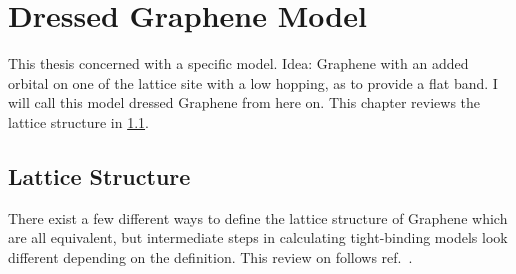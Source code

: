 \documentclass[../notes.tex]{subfiles}
\begin{document}
\raggedbottom

\chapter{Dressed Graphene Model}

This thesis concerned with a specific model.
Idea: Graphene with an added orbital on one of the lattice site with a low hopping, as to provide a flat band.
I will call this model dressed Graphene from here on.
This chapter reviews the lattice structure in \cref{sec:lattice-structure-of-graphene}.



\section{Lattice Structure}\label{sec:lattice-structure-of-graphene}

There exist a few different ways to define the lattice structure of Graphene which are all equivalent, but intermediate steps in calculating tight-binding models look different depending on the definition.
This review on  follows ref.~\cite{yangStructureGrapheneIts2018}.
\end{document}
